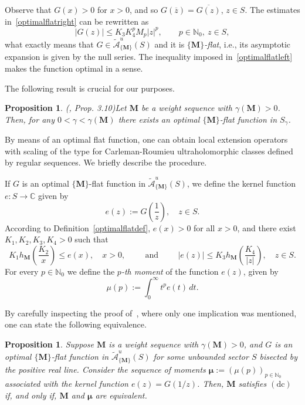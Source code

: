 \documentclass[11pt,a4paper]{article}
\theoremstyle{plain}
\newtheorem{prop}[theorem]{Proposition}
\theoremstyle{definition}
\numberwithin{equation}{section}
\newcommand{\N}{\mathbb{N}}
\newcommand{\C}{\mathbb{C}}
\newcommand{\M}{{\boldsymbol{M}}}
\def\ga{\gamma}
\newcommand{\dc}{\operatorname{(dc)}}
\begin{document}
Observe that $G(x)>0$ for $x>0$, and so $G(\overline{z})=\overline{G(z)}$, $z\in S$.
The estimates in~\eqref{optimalflatright} can be rewritten as
$$|G(z)|\le K_3K_4^pM_p|z|^p,\qquad p\in\N_0,\ z\in S,
$$
what exactly means that $G\in\widetilde{\mathcal{A}}^u_{\{\M\}}(S)$ and it is \emph{$\{\M\}$-flat}, i.e., its asymptotic expansion is given by the null series. The inequality imposed in~\eqref{optimalflatleft} makes the function optimal in a sense.


The following result is crucial for our purposes.

\begin{prop}(\cite{JimenezMiguelSanzSchindlOptFlat}, Prop. 3.10)\label{prop.ExistOptFlatFunct}
Let $\M$ be a weight sequence with $\ga(\M)>0$. Then, for any $0<\gamma<\ga(\M)$ there exists an optimal $\{\M\}$-flat function in $S_\ga$.
\end{prop}

By means of an optimal flat function, one can obtain local extension operators with scaling of the type for Carleman-Roumieu ultraholomorphic classes defined by regular sequences. We briefly describe the procedure.

If $G$ is an optimal $\{\M\}$-flat function in $\widetilde{\mathcal{A}}^u_{\{\M\}}(S)$, we define the kernel function $e\colon S\to\C$ given by
\begin{equation*}
e(z):=G\left(\frac{1}{z}\right),\quad z\in S.
\end{equation*}
According to Definition~\ref{optimalflatdef}, $e(x)>0$ for all $x>0$, and there exist $K_1,K_2,K_3,K_4>0$ such that
\begin{equation}\label{eq.Bounds_e_sector}
K_1h_{\M}\left(\frac{K_2}{x}\right)\le e(x), \quad x>0, \hspace{1cm}\text{and}\hspace{1cm} |e(z)|\le K_3h_{\M}\left(\frac{K_4}{|z|}\right),\quad z\in S.
\end{equation}
For every $p\in\mathbb{N}_0$ we define the \emph{$p$-th moment} of the function $e(z)$, given by
\begin{equation*}
\mu(p):=\int_0^\infty t^{p}e(t)\,dt.
\end{equation*}

By carefully inspecting the proof of~\cite[Prop. 3.11]{JimenezMiguelSanzSchindlOptFlat}, where only one implication was mentioned, one can state the following equivalence.

\begin{prop}\label{prop.MomentsEquivM}
Suppose $\M$ is a weight sequence with $\ga(\M)>0$, and $G$ is an optimal $\{\M\}$-flat function in $\widetilde{\mathcal{A}}^u_{\{\M\}}(S)$ for some unbounded sector $S$ bisected by the positive real line. Consider the sequence of moments $\boldsymbol{\mu}:=(\mu(p))_{p\in\N_0}$ associated with the kernel function $e(z)=G(1/z)$. Then, $\M$ satisfies $\dc$ if, and only if,
$\M$ and $\boldsymbol{\mu}$ are equivalent.
\end{prop}
\end{document}
